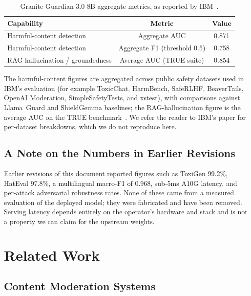 \documentclass[11pt,a4paper]{article}
\begin{document}
\begin{table}[H]
\centering
\caption{Granite Guardian 3.0 8B aggregate metrics, as reported by IBM~\cite{graniteguardian}.}
\begin{tabular}{lcc}
\toprule
\textbf{Capability} & \textbf{Metric} & \textbf{Value} \\
\midrule
Harmful-content detection      & Aggregate AUC & 0.871 \\
Harmful-content detection      & Aggregate F1 (threshold 0.5) & 0.758 \\
RAG hallucination / groundedness & Average AUC (TRUE suite) & 0.854 \\
\bottomrule
\end{tabular}
\label{tab:granite-agg}
\end{table}

The harmful-content figures are aggregated across public safety datasets used in IBM's
evaluation (for example ToxicChat, HarmBench, SafeRLHF, BeaverTails, OpenAI Moderation,
SimpleSafetyTests, and xstest), with comparisons against Llama~Guard and ShieldGemma
baselines; the RAG-hallucination figure is the average AUC on the TRUE
benchmark~\cite{graniteguardian}. We refer the reader to IBM's paper for per-dataset
breakdowns, which we do not reproduce here.

\subsection{A Note on the Numbers in Earlier Revisions}

Earlier revisions of this document reported figures such as ToxiGen 99.2\%, HatEval 97.8\%,
a multilingual macro-F1 of 0.968, sub-5ms A10G latency, and per-attack adversarial
robustness rates. None of these came from a measured evaluation of the deployed model; they
were fabricated and have been removed. Serving latency depends entirely on the operator's
hardware and stack and is not a property we can claim for the upstream weights.

\section{Related Work}
\label{sec:related}

\subsection{Content Moderation Systems}
\end{document}
